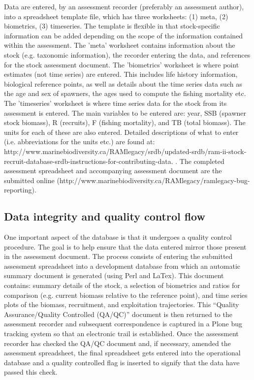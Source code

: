 \documentclass[letterpaper,12pt]{article}
\begin{document}
Data are entered, by an assessment recorder (preferably an assessment
author), into a spreadsheet template file, which has three worksheets:
(1) meta, (2) biometrics, (3) timeseries. The template is flexible in
that stock-specific information can be added depending on the scope of
the information contained within the assessment. The 'meta' worksheet
contains information about the stock (e.g. taxonomic information), the
recorder entering the data, and references for the stock assessment
document. The 'biometrics' worksheet is where point estimates (not
time series) are entered. This includes life history information,
biological reference points, as well as details about the time series
data such as the age and sex of spawners, the ages used to compute the
fishing mortality etc. The 'timeseries' worksheet is where time series
data for the stock from its assessment is entered. The main variables
to be entered are: year, SSB (spawner stock biomass), R (recruits), F
(fishing mortality), and TB (total biomass). The units for each of
these are also entered. Detailed descriptions of what to enter (i.e.
abbreviations for the units etc.) are found at:
http://www.marinebiodiversity.ca/RAMlegacy/srdb/updated-srdb/ram-ii-stock-recruit-database-srdb-instructions-for-contributing-data.
. The completed assessment spreadsheet and accompanying assessment
document are the submitted online
(http://www.marinebiodiversity.ca/RAMlegacy/ramlegacy-bug-reporting).


\subsection{Data integrity and quality control flow}
One important aspect of the database is that it undergoes a quality
control procedure. The goal is to help ensure that the data entered
mirror those present in the assessment document. The process consists
of entering the submitted assessment spreadsheet into a development
database from which an automatic summary document is generated (using
Perl and LaTex). This document contains: summary details of the stock,
a selection of biometrics and ratios for comparison (e.g. current
biomass relative to the reference point), and time series plots of the
biomass, recruitment, and exploitation trajectories. This ``Quality
Assurance/Quality Controlled (QA/QC)'' document is then returned to
the assessment recorder and subsequent correspondence is captured in a
Plone bug tracking system so that an electronic trail is established.
Once the assessment recorder has checked the QA/QC document and, if
necessary, amended the assessment spreadsheet, the final spreadsheet
gets entered into the operational database and a quality controlled
flag is inserted to signify that the data have passed this check.
 
\end{document}
